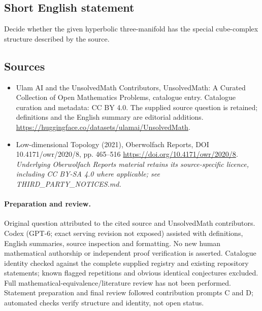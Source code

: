 \documentclass[11pt]{article}
\begin{document}
\subsection{Short English statement}
Decide whether the given hyperbolic three-manifold has the special cube-complex structure described by the source.
\subsection{Sources}
\begin{itemize}
\item[\hypertarget{source:statement:1}{S1}] Ulam AI and the UnsolvedMath Contributors, UnsolvedMath: A Curated Collection of Open Mathematics Problems, catalogue entry. Catalogue curation and metadata: CC BY 4.0. The supplied source question is retained; definitions and the English summary are editorial additions.
\url{https://huggingface.co/datasets/ulamai/UnsolvedMath}.
\item[\hypertarget{source:statement:2}{S2}] Low-dimensional Topology (2021), Oberwolfach Reports, DOI 10.4171/owr/2020/8, pp. 465--516
\url{https://doi.org/10.4171/owr/2020/8}.
\textit{Underlying Oberwolfach Reports material retains its source-specific licence, including CC BY-SA 4.0 where applicable; see THIRD\_PARTY\_NOTICES.md.}
\end{itemize}
\paragraph{Preparation and review.}
Original question attributed to the cited source and UnsolvedMath contributors. Codex (GPT-6; exact serving revision not exposed) assisted with definitions, English summaries, source inspection and formatting. No new human mathematical authorship or independent proof verification is asserted. Catalogue identity checked against the complete supplied registry and existing repository statements; known flagged repetitions and obvious identical conjectures excluded. Full mathematical-equivalence/literature review has not been performed. Statement preparation and final review followed contribution prompts C and D; automated checks verify structure and identity, not open status.
\label{end:statement}
\end{document}
